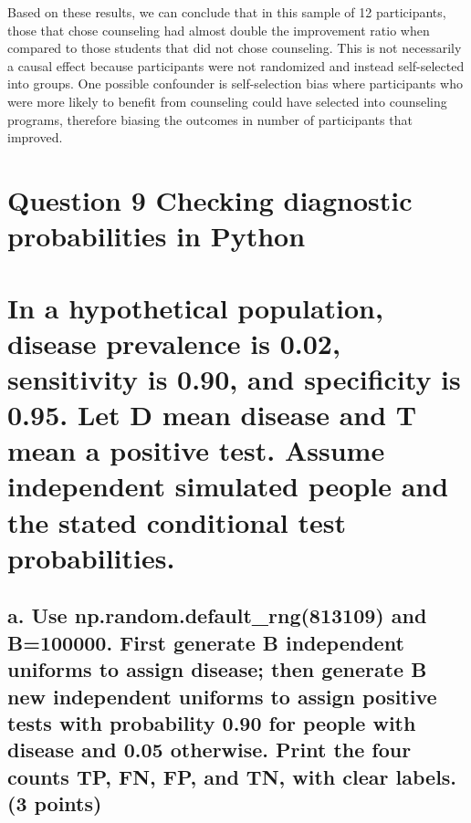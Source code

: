 \documentclass[
]{article}
\begin{document}
Based on these results, we can conclude that in this sample of 12
participants, those that chose counseling had almost double the
improvement ratio when compared to those students that did not chose
counseling. This is not necessarily a causal effect because participants
were not randomized and instead self-selected into groups. One possible
confounder is self-selection bias where participants who were more
likely to benefit from counseling could have selected into counseling
programs, therefore biasing the outcomes in number of participants that
improved.

\section{Question 9 Checking diagnostic probabilities in
Python}\label{question-9-checking-diagnostic-probabilities-in-python}

\section{In a hypothetical population, disease prevalence is 0.02,
sensitivity is 0.90, and specificity is 0.95. Let D mean disease and T
mean a positive test. Assume independent simulated people and the stated
conditional test
probabilities.}\label{in-a-hypothetical-population-disease-prevalence-is-0.02-sensitivity-is-0.90-and-specificity-is-0.95.-let-d-mean-disease-and-t-mean-a-positive-test.-assume-independent-simulated-people-and-the-stated-conditional-test-probabilities.}

\subsection{a. Use np.random.default\_rng(813109) and B=100000. First
generate B independent uniforms to assign disease; then generate B new
independent uniforms to assign positive tests with probability 0.90 for
people with disease and 0.05 otherwise. Print the four counts TP, FN,
FP, and TN, with clear labels. (3
points)}\label{a.-use-np.random.default_rng813109-and-b100000.-first-generate-b-independent-uniforms-to-assign-disease-then-generate-b-new-independent-uniforms-to-assign-positive-tests-with-probability-0.90-for-people-with-disease-and-0.05-otherwise.-print-the-four-counts-tp-fn-fp-and-tn-with-clear-labels.-3-points}
\end{document}
